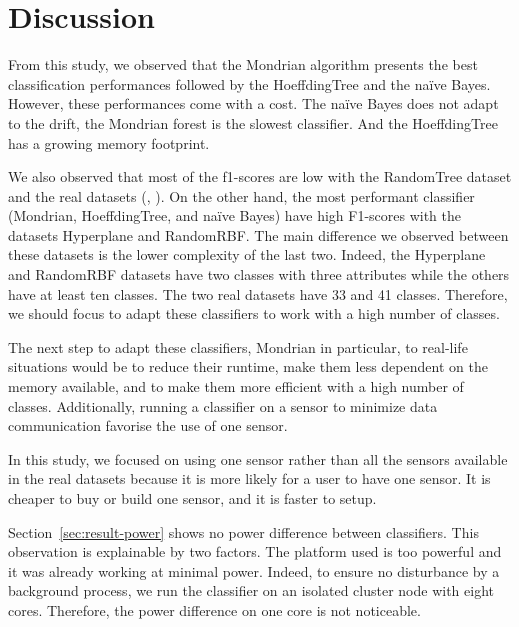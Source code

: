 \section{Discussion}

From this study, we observed that the Mondrian algorithm presents the best
classification performances followed by the HoeffdingTree and the naïve Bayes.
However, these performances come with a cost.  The naïve Bayes does not adapt
to the drift, the Mondrian forest is the slowest classifier. And the
HoeffdingTree has a growing memory footprint.

We also observed that most of the f1-scores are low with the RandomTree dataset and
the real datasets (\banosdataset, \recofitdataset). On the other hand, the most
performant classifier (Mondrian, HoeffdingTree, and naïve Bayes) have high
F1-scores with the datasets Hyperplane and RandomRBF. The main difference we
observed between these datasets is the lower complexity of the last two.
Indeed, the Hyperplane and RandomRBF datasets have two classes with three
attributes while the others have at least ten classes. The two real datasets
have 33 and 41 classes. Therefore, we should focus to adapt these classifiers
to work with a high number of classes.

The next step to adapt these classifiers, Mondrian in particular, to real-life
situations would be to reduce their runtime, make them less dependent on the
memory available, and to make them more efficient with a high number of
classes. Additionally, running a classifier on a sensor to minimize data
communication favorise the use of one sensor.


In this study, we focused on using one sensor rather than all the sensors
available in the real datasets because it is more likely for a user to have one
sensor. It is cheaper to buy or build one sensor, and it is faster to setup.


Section~\ref{sec:result-power} shows no power difference between classifiers. This
observation is explainable by two factors. The platform used is too powerful
and it was already working at minimal power. Indeed, to ensure no disturbance
by a background process, we run the classifier on an isolated cluster node with
eight cores. Therefore, the power difference on one core is not noticeable.

